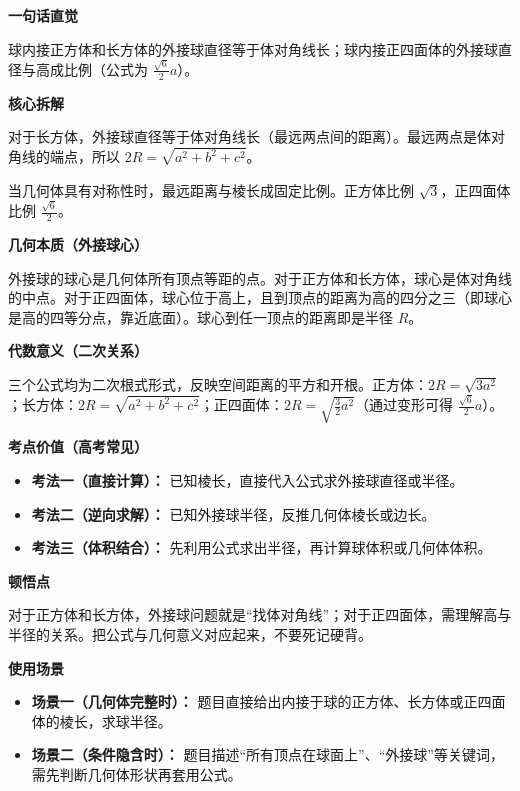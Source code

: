 \begin{explanationbox}
	\textbf{\textcolor{CExplanation}{一句话直觉}}

	球内接正方体和长方体的外接球直径等于体对角线长；球内接正四面体的外接球直径与高成比例（公式为 $\frac{\sqrt{6}}{2}a$）。

	\medskip
	\textbf{\textcolor{CExplanation}{核心拆解}}
	\begin{description}[style=nextline, leftmargin=2.8em, labelsep=0.5em, itemsep=0.45em]
		\item[\textbf{要点一（体对角线原则）：}] 对于长方体，外接球直径等于体对角线长（最远两点间的距离）。最远两点是体对角线的端点，所以 $2R = \sqrt{a^2+b^2+c^2}$。
		\item[\textbf{要点二（常数系数提取）：}] 当几何体具有对称性时，最远距离与棱长成固定比例。正方体比例 $\sqrt{3}$，正四面体比例 $\frac{\sqrt{6}}{2}$。
	\end{description}

	\medskip
	\textbf{\textcolor{CExplanation}{几何本质（外接球心）}}

	外接球的球心是几何体所有顶点等距的点。对于正方体和长方体，球心是体对角线的中点。对于正四面体，球心位于高上，且到顶点的距离为高的四分之三（即球心是高的四等分点，靠近底面）。球心到任一顶点的距离即是半径 $R$。

	\medskip
	\textbf{\textcolor{CExplanation}{代数意义（二次关系）}}

	三个公式均为二次根式形式，反映空间距离的平方和开根。正方体：$2R = \sqrt{3a^2}$；长方体：$2R = \sqrt{a^2+b^2+c^2}$；正四面体：$2R = \sqrt{\frac{3}{2}a^2}$（通过变形可得 $\frac{\sqrt{6}}{2}a$）。

	\medskip
	\textbf{\textcolor{CExplanation}{考点价值（高考常见）}}
	\begin{itemize}[leftmargin=*, itemsep=0.5em, topsep=0.4em]
		\item \textbf{考法一（直接计算）：} 已知棱长，直接代入公式求外接球直径或半径。
		\item \textbf{考法二（逆向求解）：} 已知外接球半径，反推几何体棱长或边长。
		\item \textbf{考法三（体积结合）：} 先利用公式求出半径，再计算球体积或几何体体积。
	\end{itemize}

	\medskip
	\textbf{\textcolor{CExplanation}{顿悟点}}

	对于正方体和长方体，外接球问题就是“找体对角线”；对于正四面体，需理解高与半径的关系。把公式与几何意义对应起来，不要死记硬背。

	\medskip
	\textbf{\textcolor{CExplanation}{使用场景}}
	\begin{itemize}[leftmargin=*, itemsep=0.5em, topsep=0.4em]
		\item \textbf{场景一（几何体完整时）：} 题目直接给出内接于球的正方体、长方体或正四面体的棱长，求球半径。
		\item \textbf{场景二（条件隐含时）：} 题目描述“所有顶点在球面上”、“外接球”等关键词，需先判断几何体形状再套用公式。
	\end{itemize}
\end{explanationbox}
